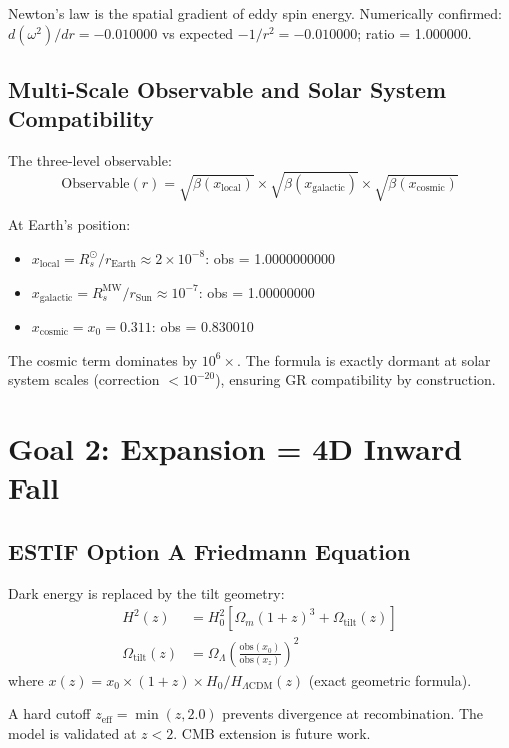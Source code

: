 \documentclass[12pt]{article}
\begin{document}
Newton's law is the spatial gradient of eddy spin energy. Numerically confirmed:
$d(\omega^2)/dr = -0.010000$ vs expected $-1/r^2 = -0.010000$; ratio = 1.000000.

\subsection{Multi-Scale Observable and Solar System Compatibility}

The three-level observable:
\begin{equation}
\text{Observable}(r) = \sqrt{\beta(x_\text{local})} \times \sqrt{\beta(x_\text{galactic})} \times \sqrt{\beta(x_\text{cosmic})}
\end{equation}

At Earth's position:
\begin{itemize}
\item $x_\text{local} = R_s^\odot / r_\text{Earth} \approx 2\times10^{-8}$: obs = 1.0000000000
\item $x_\text{galactic} = R_s^\text{MW} / r_\text{Sun} \approx 10^{-7}$: obs = 1.00000000
\item $x_\text{cosmic} = x_0 = 0.311$: obs = 0.830010
\end{itemize}

The cosmic term dominates by $10^6\times$. The formula is exactly dormant at solar system
scales (correction $< 10^{-20}$), ensuring GR compatibility by construction.

\section{Goal 2: Expansion = 4D Inward Fall}

\subsection{ESTIF Option A Friedmann Equation}

Dark energy is replaced by the tilt geometry:
\begin{align}
H^2(z) &= H_0^2 \left[\Omega_m(1+z)^3 + \Omega_\text{tilt}(z)\right] \\
\Omega_\text{tilt}(z) &= \Omega_\Lambda \left(\frac{\text{obs}(x_0)}{\text{obs}(x_z)}\right)^2
\end{align}
where $x(z) = x_0 \times (1+z) \times H_0/H_{\Lambda\text{CDM}}(z)$ (exact geometric formula).

A hard cutoff $z_\text{eff} = \min(z, 2.0)$ prevents divergence at recombination.
The model is validated at $z < 2$. CMB extension is future work.
\end{document}
